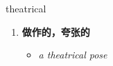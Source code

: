 
\begin{frame}
{\huge theatrical}
\begin{center}
\begin{enumerate}\Large
  \item \textbf{做作的，夸张的}
  \begin{itemize}
    \item \em{\Large{a theatrical pose}}
  \end{itemize}
\end{enumerate}
\end{center}
\end{frame}
